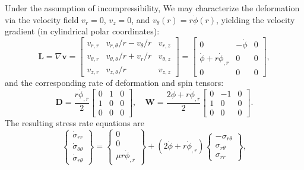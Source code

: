 \documentclass[12pt]{article}
\begin{document}
Under the assumption of incompressibility, We may characterize the deformation via the velocity field $v_r = 0$, $v_z = 0$, and $v_\theta (r) = r \dot{\phi}(r)$, yielding the velocity gradient (in cylindrical polar coordinates):
\begin{equation}
  \mathbf{L} = \nabla \mathbf{v} = \left[ \begin{array}{ccc} v_{r,r} & v_{r,\theta}/r-v_\theta /r & v_{r,z} \\
      v_{\theta,r} & v_{\theta,\theta}/r + v_r /r & v_{\theta,z} \\
      v_{z,r} & v_{z,\theta} /r & v_{z,z} \end{array} \right] = 
  \left[ \begin{array}{ccc} 0 & -\dot{\phi} & 0 \\
      \dot{\phi} + r \dot{\phi}_{,r} & 0 & 0 \\
      0 & 0 & 0 \end{array} \right],
\end{equation}
and the corresponding rate of deformation and spin tensors:
\begin{equation}
  \mathbf{D} = \frac{r \dot{\phi}_{,r}}{2} \left[ \begin{array}{ccc} 0 & 1 & 0 \\
      1 & 0 & 0 \\
      0 & 0 & 0 \end{array} \right], \quad \mathbf{W} = 
  \frac{2 \dot{\phi} + r \dot{\phi}_{,r}}{2} \left[ \begin{array}{ccc} 0 & - 1 & 0 \\
      1 & 0 & 0 \\
      0 & 0 & 0 \end{array} \right].
\end{equation}
The resulting stress rate equations are
\begin{equation}
  \left\{ \begin{array}{c} \dot{\sigma}_{rr} \\ \dot{\sigma}_{\theta \theta} \\ \dot{\sigma}_{r \theta} \end{array} \right\} = \left\{ \begin{array}{c} 0 \\ 0 \\ \mu r \dot{\phi}_{,r} \end{array} \right\} + 
  (2 \dot{\phi} + r \dot{\phi}_{,r}) \left\{ \begin{array}{c} - \sigma_{r \theta} \\ \sigma_{r \theta} \\ \sigma_{rr} \end{array} \right\},
\end{equation}
\end{document}
